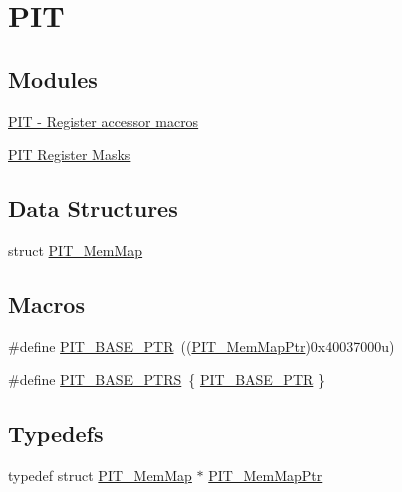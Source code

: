 \hypertarget{group___p_i_t___peripheral}{}\section{P\+IT}
\label{group___p_i_t___peripheral}
\subsection*{Modules}
\begin{DoxyCompactItemize}
\item 
\hyperlink{group___p_i_t___register___accessor___macros}{P\+I\+T -\/ Register accessor macros}
\item 
\hyperlink{group___p_i_t___register___masks}{P\+I\+T Register Masks}
\end{DoxyCompactItemize}
\subsection*{Data Structures}
\begin{DoxyCompactItemize}
\item 
struct \hyperlink{struct_p_i_t___mem_map}{P\+I\+T\+\_\+\+Mem\+Map}
\end{DoxyCompactItemize}
\subsection*{Macros}
\begin{DoxyCompactItemize}
\item 
\#define \hyperlink{group___p_i_t___peripheral_ga70be45f58402a8e6d2ce4df7b23aa41c}{P\+I\+T\+\_\+\+B\+A\+S\+E\+\_\+\+P\+TR}~((\hyperlink{group___p_i_t___peripheral_ga4efe9d2676c775562cb282254af9a937}{P\+I\+T\+\_\+\+Mem\+Map\+Ptr})0x40037000u)
\item 
\#define \hyperlink{group___p_i_t___peripheral_ga403e0ed71b80cfe3e085fe6b56b5eff0}{P\+I\+T\+\_\+\+B\+A\+S\+E\+\_\+\+P\+T\+RS}~\{ \hyperlink{group___p_i_t___peripheral_ga70be45f58402a8e6d2ce4df7b23aa41c}{P\+I\+T\+\_\+\+B\+A\+S\+E\+\_\+\+P\+TR} \}
\end{DoxyCompactItemize}
\subsection*{Typedefs}
\begin{DoxyCompactItemize}
\item 
typedef struct \hyperlink{struct_p_i_t___mem_map}{P\+I\+T\+\_\+\+Mem\+Map} $\ast$ \hyperlink{group___p_i_t___peripheral_ga4efe9d2676c775562cb282254af9a937}{P\+I\+T\+\_\+\+Mem\+Map\+Ptr}
\end{DoxyCompactItemize}



